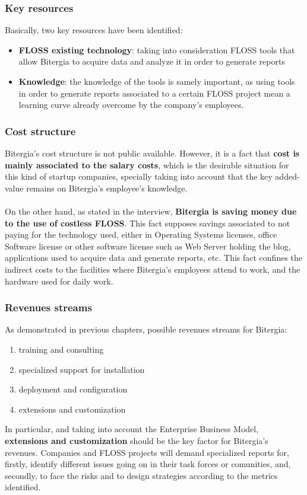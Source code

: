\documentclass[11pt]{article}
\begin{document}
\subsubsection{Key resources}
Basically, two key resources have been identified:
\begin{itemize}
\item{\textbf{FLOSS existing technology}: taking into consideration FLOSS tools that allow Bitergia to acquire data and analyze it in order to generate reports}
\item{\textbf{Knowledge}: the knowledge of the tools is samely important, as using tools in order to generate reports associated to a certain FLOSS project mean a learning curve already overcome by the company's employees.}
\end{itemize}

\subsubsection{Cost structure}
Bitergia's cost structure is not public available. However, it is a fact that \textbf{cost is mainly associated to the salary costs}, which is the desirable situation for this kind of startup companies, specially taking into account that the key added-value remains on Bitergia's employee's knowledge.\\
\\
On the other hand, as stated in the interview, \textbf{Bitergia is saving money due to the use of costless FLOSS}. This fact supposes savings associated to not paying for the technology used, either in Operating Systems licenses, office Software license or other software license such as Web Server holding the blog, applications used to acquire data and generate reports, etc. This fact confines the indirect costs to the facilities where Bitergia's employees attend to work, and the hardware used for daily work.

\subsubsection{Revenues streams}
As demonstrated in previous chapters, possible revenues streams for Bitergia:
\begin{enumerate}\itemsep0.2pt
\item {training and consulting}
\item {specialized support for
installation}
\item {deployment and configuration}
\item {extensions and customization}
\end{enumerate}
In particular, and taking into account the Enterprise Business Model, \textbf{extensions and customization} should be the key factor for Bitergia's revenues. Companies and FLOSS projects will demand specialized reports for, firstly, identify different issues going on in their task forces or comunities, and, secondly, to face the risks and to design strategies according to the metrics identified.
\end{document}
